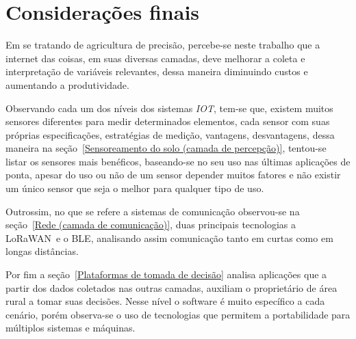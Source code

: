 \documentclass[
article,			%
12pt,				%
oneside,			%
a4paper,			%
english,			%
brazil,				%
sumario=tradicional
]{abntex2}
\begin{document}
\section{Considerações finais}
Em se tratando de agricultura de precisão, percebe-se neste trabalho que a internet das coisas, em suas diversas camadas, deve melhorar a coleta e interpretação de variáveis relevantes, dessa maneira diminuindo custos e aumentando a produtividade.

Observando cada um dos níveis dos sistemas \textit{IOT}, tem-se que, existem muitos sensores diferentes para medir determinados elementos, cada sensor com suas próprias especificações, estratégias de medição, vantagens, desvantagens, dessa maneira na seção~\ref{Sensoreamento do solo (camada de percepção)}, tentou-se listar os sensores mais benéficos, baseando-se no seu uso nas últimas aplicações de ponta, apesar do uso ou não de um sensor depender muitos fatores e não existir um único sensor que seja o melhor para qualquer tipo de uso.

Outrossim, no que se refere a sistemas de comunicação observou-se na seção~\ref{Rede (camada de comunicação)}, duas principais tecnologias a LoRaWAN\texttrademark~e o BLE, analisando assim comunicação tanto em curtas como em longas distâncias.

Por fim a seção~\ref{Plataformas de tomada de decisão} analisa aplicações que a partir dos dados coletados nas outras camadas, auxiliam o proprietário de área rural a tomar suas decisões. Nesse nível o software é muito específico a cada cenário, porém observa-se o uso de tecnologias que permitem a portabilidade para múltiplos sistemas e máquinas.


\postextual


\end{document}
